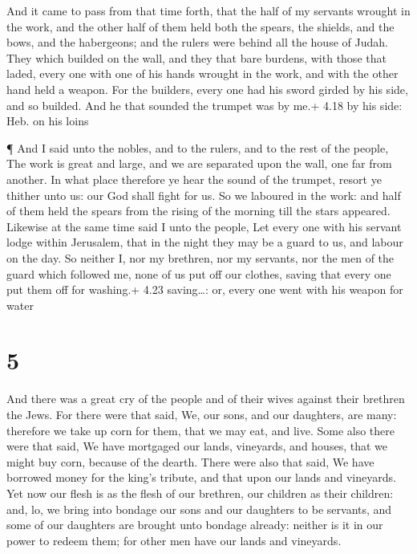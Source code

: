  And it came to pass from that time forth, that the half of
my servants wrought in the work, and the other half of them held both
the spears, the shields, and the bows, and the habergeons; and the
rulers were behind all the house of Judah.  They which
builded on the wall, and they that bare burdens, with those that laded,
every one with one of his hands wrought in the work, and with the other
hand held a weapon.  For the builders, every one had his
sword girded by his side, and so builded. And he that sounded the
trumpet was by me.+ 4.18 by his side: Heb. on his loins

 ¶ And I said unto the nobles, and to the rulers, and to
the rest of the people, The work is great and large, and we are
separated upon the wall, one far from another.  In what
place therefore ye hear the sound of the trumpet, resort ye thither unto
us: our God shall fight for us.  So we laboured in the
work: and half of them held the spears from the rising of the morning
till the stars appeared.  Likewise at the same time said I
unto the people, Let every one with his servant lodge within Jerusalem,
that in the night they may be a guard to us, and labour on the day.
 So neither I, nor my brethren, nor my servants, nor the
men of the guard which followed me, none of us put off our clothes,
saving that every one put them off for washing.+ 4.23 saving\ldots: or,
every one went with his weapon for water

\hypertarget{section-4}{%
\section{5}\label{section-4}}

 And there was a great cry of the people and of their wives
against their brethren the Jews.  For there were that said,
We, our sons, and our daughters, are many: therefore we take up corn for
them, that we may eat, and live.  Some also there were that
said, We have mortgaged our lands, vineyards, and houses, that we might
buy corn, because of the dearth.  There were also that said,
We have borrowed money for the king's tribute, and that upon our lands
and vineyards.  Yet now our flesh is as the flesh of our
brethren, our children as their children: and, lo, we bring into bondage
our sons and our daughters to be servants, and some of our daughters are
brought unto bondage already: neither is it in our power to redeem them;
for other men have our lands and vineyards.


